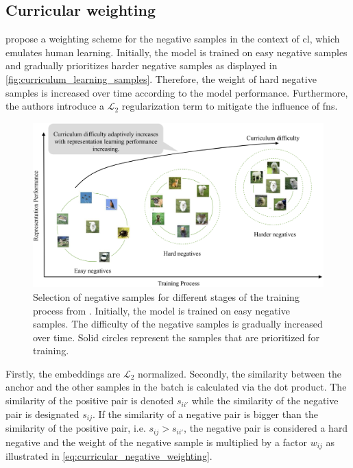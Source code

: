 \subsection{Curricular weighting}\label{subsec:curricular_weighting}

\citet{curricular_weighting_2024} propose a weighting scheme for the negative samples 
in the context of \ac{cl}, which emulates human learning.
Initially, the model is trained on easy negative samples and gradually prioritizes harder negative samples 
as displayed in \autoref{fig:curriculum_learning_samples}.
Therefore, the weight of hard negative samples is increased over time according to the model performance.
Furthermore, the authors introduce a $\mathcal{L}_2$ regularization term to mitigate the influence of \acp{fn}.

\begin{figure}[h] %
    \centering
    \includegraphics[width=360pt]{images/curriculum_learning_samples.png}
    \caption{Selection of negative samples for different stages of the training process 
    from \citet{curricular_weighting_2024}.
    Initially, the model is trained on easy negative samples.
    The difficulty of the negative samples is gradually increased over time.
    Solid circles represent the samples that are prioritized for training.
    }
    \label{fig:curriculum_learning_samples}
\end{figure}

Firstly, the embeddings are $\mathcal{L}_2$ normalized.
Secondly, the similarity between the anchor and the other samples in the batch is calculated via the dot product.
The similarity of the positive pair is denoted $s_{ii'}$ while the similarity of the negative pair is designated $s_{ij}$.
If the similarity of a negative pair is bigger than the similarity of the positive pair, 
i.e. $s_{ij} > s_{ii'}$, the negative pair is considered a hard negative and 
the weight of the negative sample is multiplied by a factor $w_{ij}$ 
as illustrated in \eqref{eq:curricular_negative_weighting}.

